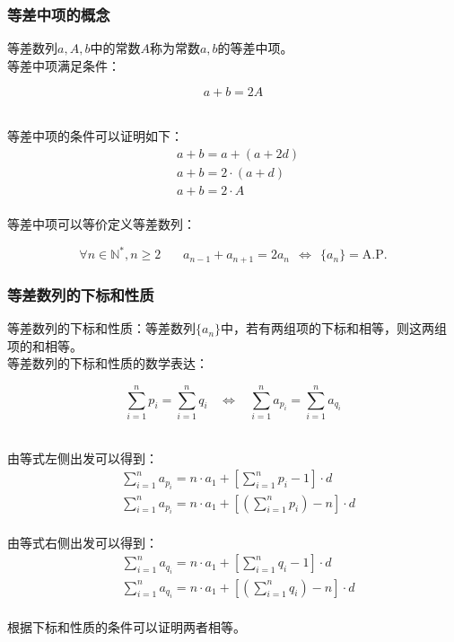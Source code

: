 \documentclass[UTF8]{ctexart}
\begin{document}
\newpage

\subsubsection{等差中项的概念}
    \setcounter{equation}{0}
    等差数列$a,A,b$中的常数$A$称为常数$a,b$的等差中项。\\[3mm]
    等差中项满足条件：
    \begin{large}
        \begin{equation*}
            a+b=2A
        \end{equation*}
    \end{large}\\
    等差中项的条件可以证明如下：
    \begin{align}
        &a+b=a+(a+2d)\\[3mm]
        &a+b=2\cdot(a+d)\\[3mm]
        &a+b=2\cdot A
    \end{align}\\
    等差中项可以等价定义等差数列：
    \begin{large}
        \begin{equation*}
            \forall n\in\mathbb{N^*},n\geq 2~~~~~~~~a_{n-1}+a_{n+1}=2a_n~~\Longleftrightarrow~~\{a_n\}=\text{A.P.}
        \end{equation*}
    \end{large}

\subsubsection{等差数列的下标和性质}
    \setcounter{equation}{0}
    等差数列的下标和性质：等差数列$\{a_n\}$中，若有两组项的下标和相等，则这两组项的和相等。\\[3mm]
    等差数列的下标和性质的数学表达：
    \begin{large}
        \begin{equation*}
            \sum_{i=1}^n p_i=\sum_{i=1}^n q_i~~~~\Longleftrightarrow~~~~\sum_{i=1}^n a_{p_i}=\sum_{i=1}^n a_{q_i}
        \end{equation*}
    \end{large}\\
    由等式左侧出发可以得到：
    \begin{align}
        &\sum_{i=1}^n a_{p_i}=n\cdot a_1+\left[\sum_{i=1}^n p_i-1\right]\cdot d\\[3mm]
        &\sum_{i=1}^n a_{p_i}=n\cdot a_1+\left[\left(\sum_{i=1}^n p_i\right)-n\right]\cdot d
    \end{align}\\
    由等式右侧出发可以得到：
    \begin{align}
        &\sum_{i=1}^n a_{q_i}=n\cdot a_1+\left[\sum_{i=1}^n q_i-1\right]\cdot d\\[3mm]
        &\sum_{i=1}^n a_{q_i}=n\cdot a_1+\left[\left(\sum_{i=1}^n q_i\right)-n\right]\cdot d
    \end{align}\\
    根据下标和性质的条件可以证明两者相等。
\end{document}
